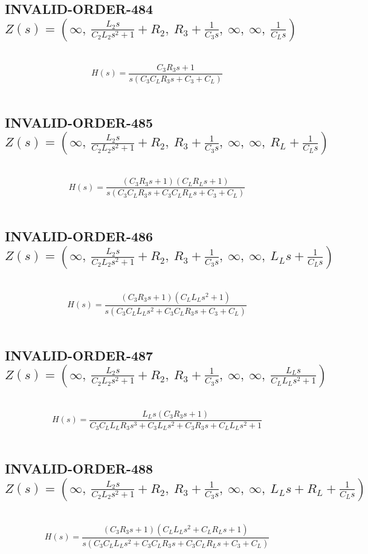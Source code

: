 \documentclass{article}
\begin{document}
\subsection{INVALID-ORDER-484 $Z(s) = \left( \infty, \  \frac{L_{2} s}{C_{2} L_{2} s^{2} + 1} + R_{2}, \  R_{3} + \frac{1}{C_{3} s}, \  \infty, \  \infty, \  \frac{1}{C_{L} s}\right)$ } \ 
\textbf{\[H(s) = \frac{C_{3} R_{3} s + 1}{s \left(C_{3} C_{L} R_{3} s + C_{3} + C_{L}\right)}\] } \ 
\subsection{INVALID-ORDER-485 $Z(s) = \left( \infty, \  \frac{L_{2} s}{C_{2} L_{2} s^{2} + 1} + R_{2}, \  R_{3} + \frac{1}{C_{3} s}, \  \infty, \  \infty, \  R_{L} + \frac{1}{C_{L} s}\right)$ } \ 
\textbf{\[H(s) = \frac{\left(C_{3} R_{3} s + 1\right) \left(C_{L} R_{L} s + 1\right)}{s \left(C_{3} C_{L} R_{3} s + C_{3} C_{L} R_{L} s + C_{3} + C_{L}\right)}\] } \ 
\subsection{INVALID-ORDER-486 $Z(s) = \left( \infty, \  \frac{L_{2} s}{C_{2} L_{2} s^{2} + 1} + R_{2}, \  R_{3} + \frac{1}{C_{3} s}, \  \infty, \  \infty, \  L_{L} s + \frac{1}{C_{L} s}\right)$ } \ 
\textbf{\[H(s) = \frac{\left(C_{3} R_{3} s + 1\right) \left(C_{L} L_{L} s^{2} + 1\right)}{s \left(C_{3} C_{L} L_{L} s^{2} + C_{3} C_{L} R_{3} s + C_{3} + C_{L}\right)}\] } \ 
\subsection{INVALID-ORDER-487 $Z(s) = \left( \infty, \  \frac{L_{2} s}{C_{2} L_{2} s^{2} + 1} + R_{2}, \  R_{3} + \frac{1}{C_{3} s}, \  \infty, \  \infty, \  \frac{L_{L} s}{C_{L} L_{L} s^{2} + 1}\right)$ } \ 
\textbf{\[H(s) = \frac{L_{L} s \left(C_{3} R_{3} s + 1\right)}{C_{3} C_{L} L_{L} R_{3} s^{3} + C_{3} L_{L} s^{2} + C_{3} R_{3} s + C_{L} L_{L} s^{2} + 1}\] } \ 
\subsection{INVALID-ORDER-488 $Z(s) = \left( \infty, \  \frac{L_{2} s}{C_{2} L_{2} s^{2} + 1} + R_{2}, \  R_{3} + \frac{1}{C_{3} s}, \  \infty, \  \infty, \  L_{L} s + R_{L} + \frac{1}{C_{L} s}\right)$ } \ 
\textbf{\[H(s) = \frac{\left(C_{3} R_{3} s + 1\right) \left(C_{L} L_{L} s^{2} + C_{L} R_{L} s + 1\right)}{s \left(C_{3} C_{L} L_{L} s^{2} + C_{3} C_{L} R_{3} s + C_{3} C_{L} R_{L} s + C_{3} + C_{L}\right)}\] } \ 
\end{document}
